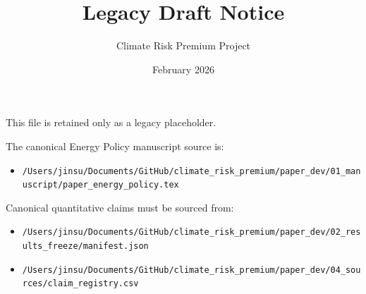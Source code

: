 \documentclass[12pt]{article}
\title{Legacy Draft Notice}
\author{Climate Risk Premium Project}
\date{February 2026}
\begin{document}
\maketitle

This file is retained only as a legacy placeholder.

The canonical Energy Policy manuscript source is:

\begin{itemize}
    \item \texttt{/Users/jinsu/Documents/GitHub/climate\_risk\_premium/paper\_dev/01\_manuscript/paper\_energy\_policy.tex}
\end{itemize}

Canonical quantitative claims must be sourced from:

\begin{itemize}
    \item \texttt{/Users/jinsu/Documents/GitHub/climate\_risk\_premium/paper\_dev/02\_results\_freeze/manifest.json}
    \item \texttt{/Users/jinsu/Documents/GitHub/climate\_risk\_premium/paper\_dev/04\_sources/claim\_registry.csv}
\end{itemize}
\end{document}
